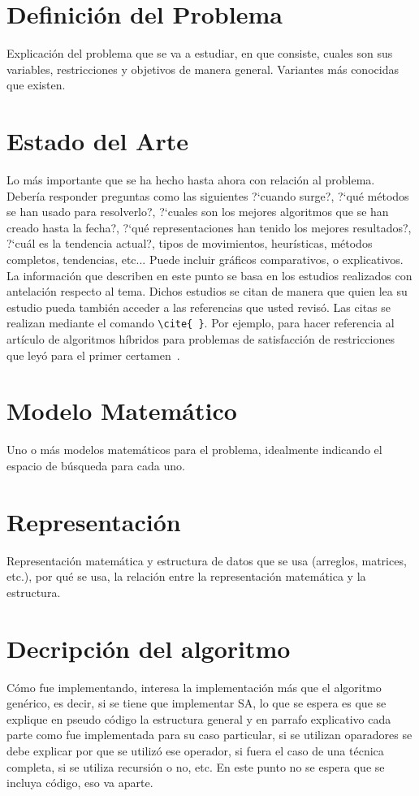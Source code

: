 \documentclass[letter, 10pt]{article}
\begin{document}
\section{Definici\'on del Problema}
Explicaci\'on del problema que se va a estudiar, en que consiste, cuales son sus variables, restricciones y objetivos de manera general. Variantes m\'as conocidas que existen.

\section{Estado del Arte}
Lo m\'as importante que se ha hecho hasta ahora con relaci\'on al problema. Deber\'ia responder preguntas como las siguientes ?`cuando surge?, ?`qu\'e m\'etodos se han usado para resolverlo?, ?`cuales son los mejores algoritmos que se han creado hasta la fecha?, ?`qu\'e representaciones han tenido los mejores resultados?, ?`cu\'al es la tendencia actual?, tipos de movimientos, heur\'isticas, m\'etodos completos, tendencias, etc... Puede incluir gr\'aficos comparativos, o explicativos.\\
La informaci\'on que describen en este punto se basa en los estudios realizados con antelaci\'on respecto al tema. Dichos estudios se citan de manera que quien lea su estudio pueda tambi\'en
 acceder a las referencias que usted revis\'o. Las citas se realizan mediante el comando \verb+\cite{ }+.
Por ejemplo, para hacer referencia al art\'iculo de algoritmos h\'ibridos para problemas de satisfacci\'on 
 de restricciones que ley\'o para el primer certamen~\cite{Prosser93Hybrid}.

\section{Modelo Matem\'atico}
Uno o m\'as modelos matem\'aticos para el problema, idealmente indicando el espacio de b\'usqueda para cada uno.

\section{Representaci\'on}
Representaci\'on matem\'atica y estructura de datos que se usa (arreglos, matrices, etc.), por qu\'e se usa, la relaci\'on entre la 
representaci\'on matem\'atica y la estructura.

\section{Decripci\'on del algoritmo}
C\'omo fue implementando, interesa la implementaci\'on m\'as que el algoritmo gen\'erico, es decir,
si se tiene que implementar SA, lo que se espera es que se explique en pseudo c\'odigo la estructura
general y en parrafo explicativo cada parte como fue implementada para su caso particular, si
se utilizan oparadores se debe explicar por que se utiliz\'o ese operador, si fuera el caso de una
t\'ecnica completa, si se utiliza recursi\'on o no, etc. En este punto no se espera que se incluya
c\'odigo, eso va aparte.
\end{document}
